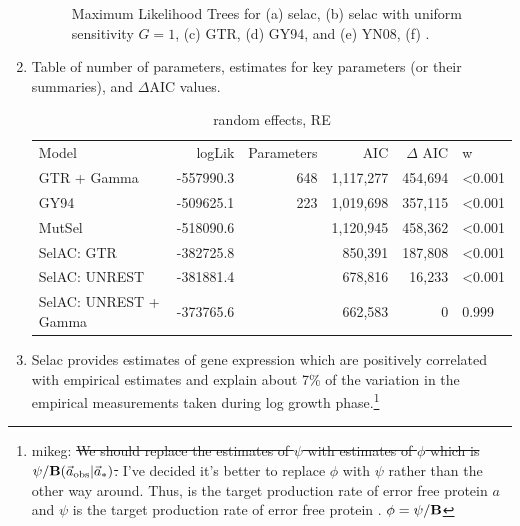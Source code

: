 \documentclass{article}
\newcommand{\DeltaAIC}{\ensuremath{\Delta\text{AIC}}\xspace}
\newcommand{\Funcaobsvec}{\ensuremath{\Func(\aobsvec|\aoptvec)}\xspace}
\newcommand{\Func}{\ensuremath{\text{\textbf{B}}}\xspace}
\newcommand{\aobsvec}{\ensuremath{\Vec{a}_{\text{obs}}}\xspace}
\newcommand{\aoptvec}{\ensuremath{\Vec{a}_*}\xspace}
\begin{document}
\begin{enumerate}
\begin{figure}[H]
  \qquad
  \caption{Maximum Likelihood Trees for (a) selac, (b) selac with uniform sensitivity $G = 1$, (c) GTR, (d) GY94, and (e) YN08, (f) \citet{LartillotAndPhilippe2004}.}
  \label{fig:MleTrees}
\end{figure}
\item Table of number of parameters, estimates for key parameters (or their summaries), and \DeltaAIC values.
\begin{table}
\begin{tabular}{lrrrrl}
  Model                 & logLik   & Parameters&     AIC& $\Delta$ AIC& w\\
  GTR + Gamma           & -557990.3&        648& 1,117,277& 454,694& <0.001\\
  GY94                  & -509625.1&        223& 1,019,698& 357,115& <0.001\\
  MutSel                & -518090.6&           & 1,120,945& 458,362& <0.001\\
  SelAC: GTR            & -382725.8&           &   850,391& 187,808& <0.001\\
  SelAC: UNREST         & -381881.4&           &   678,816&  16,233& <0.001\\
  SelAC: UNREST + Gamma & -373765.6&           &   662,583&       0& 0.999
\end{tabular}
\caption{random effects, RE}
\end{table}

\item Selac provides estimates of gene expression which are positively correlated with empirical estimates and explain about 7\% of the variation in the empirical measurements taken during log growth phase.\footnote{mikeg: \sout{We should replace the estimates of $\psi$ with estimates of $\phi$ which is $\psi/\Funcaobsvec$.} 
I've decided it's better to replace $\phi$ with $\psi$ rather than the other way around.
Thus, \phi is the target production rate of error free protein $a$ and $\psi$ is the target production rate of error free protein \astar.
$\phi = \psi/\Func$}


\end{enumerate}
\end{document}

